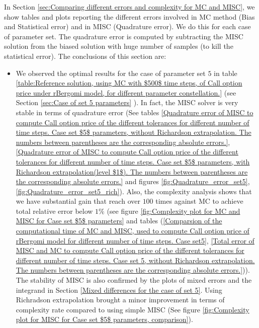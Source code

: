 \documentclass[11pt]{article}
\begin{document}
In Section \ref{sec:Comparing different  errors and complexity for MC and MISC}, we show tables and plots reporting  the different errors involved in MC method (Bias and Statistical error) and in MISC (Quadrature error). We do this for each case of parameter set. The quadrature error is computed by subtracting the MISC solution from the biased solution with huge number of samples (to kill the statistical error). The conclusions of this section are: 

\begin{itemize}
	\item We observed the optimal results for the case of parameter set $5$ in table \ref{table:Reference solution, using MC with $500$ time steps, of Call option price under rBergomi model, for different parameter constellation.} (see Section \ref{sec:Case of set 5 parameters} ). In fact, the MISC solver is very stable in terms of quadrature error (See tables \ref{Quadrature error of MISC to compute Call option price of the different tolerances for different number of time steps. Case  set $5$ parameters, without Richardson extrapolation. The numbers between parentheses are the corresponding absolute errors.}, \ref{Quadrature error of MISC to compute Call option price of the different tolerances for different number of time steps. Case set $5$ parameters, with Richardson extrapolation(level $1$). The numbers between parentheses are the corresponding absolute errors.} and figures \ref{fig:Quadrature_error_set5}, \ref{fig:Quadrature_error_set5_rich}). Also, the complexity analysis shows that we have substantial gain that reach over $100$ times against MC to achieve total relative error below $1\%$ (see figure \ref{fig:Complexity plot for MC and MISC for Case set $5$ parameters} and tables (\ref{Comparsion of the computational time of  MC and MISC, used to compute Call option price of rBergomi model for different number of time steps. Case set5}, \ref{Total error of MISC and MC to compute Call option price of the different tolerances for different number of time steps. Case set 5, without Richardson extrapolation. The numbers between parentheses are the corresponding absolute errors.})). The stability of MISC is also confirmed by the plots of mixed errors and the integrand in Section \ref{Mixed differences for the case of set 5}. Using Richradson extrapolation brought a minor improvement in terms of complexity rate compared to using simple MISC (See figure \ref{fig:Complexity plot for  MISC for Case set $5$ parameters, comparison}).
	

\end{itemize}
\end{document}
